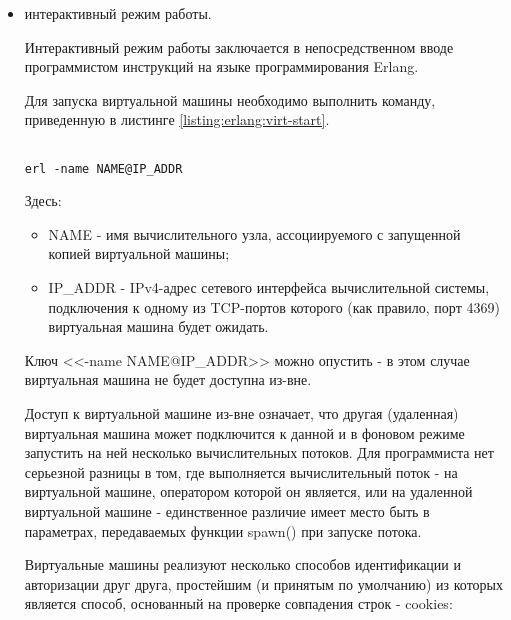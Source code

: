 \begin{itemize}

	\item интерактивный режим работы.

	Интерактивный режим работы заключается в непосредственном вводе программистом инструкций на языке программирования Erlang.

	Для запуска виртуальной машины необходимо выполнить команду, приведенную в листинге \ref{listing:erlang:virt-start}.

\begin{lstlisting}

erl -name NAME@IP_ADDR

\end{lstlisting}
\mylistingend

	Здесь:
	
	\begin{itemize}
	
		\item NAME - имя вычислительного узла, ассоциируемого с запущенной копией виртуальной машины;
		\item IP\_ADDR - IPv4-адрес сетевого интерфейса вычислительной системы, подключения к одному из TCP-портов которого (как правило, порт 4369) виртуальная машина будет ожидать.

	\end{itemize}

	Ключ <<-name NAME@IP\_ADDR>> можно опустить - в этом случае виртуальная машина не будет доступна из-вне.

	Доступ к виртуальной машине из-вне означает, что другая (удаленная) виртуальная машина может подключится к данной и в фоновом режиме запустить на ней несколько вычислительных потоков. Для программиста нет серьезной разницы в том, где выполняется вычислительный поток - на виртуальной машине, оператором которой он является, или на удаленной виртуальной машине - единственное различие имеет место быть в параметрах, передаваемых функции spawn() при запуске потока.

	Виртуальные машины реализуют несколько способов идентификации и авторизации друг друга, простейшим (и принятым по умолчанию) из которых является способ, основанный на проверке совпадения строк - cookies:

	\begin{enumerate}


\end{enumerate}
\end{itemize}
